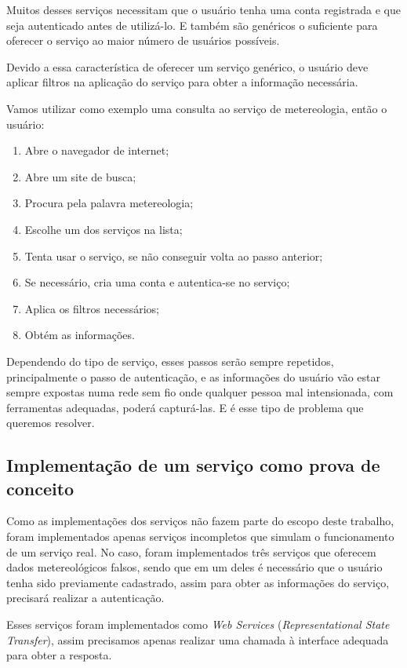 Muitos desses serviços necessitam que o usuário tenha uma conta registrada e que seja autenticado antes de utilizá-lo. E também são genéricos o suficiente para oferecer o serviço ao maior número de usuários possíveis.

Devido a essa característica de oferecer um serviço genérico, o usuário deve aplicar filtros na aplicação do serviço para obter a informação necessária.

Vamos utilizar como exemplo uma consulta ao serviço de metereologia, então o usuário:
\begin{footnotesize}
  \begin{enumerate}
  \item Abre o navegador de internet;
  \item Abre um site de busca;
  \item Procura pela palavra metereologia;
  \item Escolhe um dos serviços na lista;
  \item Tenta usar o serviço, se não conseguir volta ao passo anterior;
  \item Se necessário, cria uma conta e autentica-se no serviço;
  \item Aplica os filtros necessários;
  \item Obtém as informações.
  \end{enumerate}
\end{footnotesize}

Dependendo do tipo de serviço, esses passos serão sempre repetidos, principalmente o passo de autenticação, e as informações do usuário vão estar sempre expostas numa rede sem fio onde qualquer pessoa mal intensionada, com ferramentas adequadas, poderá capturá-las. E é esse tipo de problema que queremos resolver.

\subsection{Implementação de um serviço como prova de conceito}
Como as implementações dos serviços não fazem parte do escopo deste trabalho, foram implementados apenas serviços incompletos que simulam o funcionamento de um serviço real. No caso, foram implementados três serviços que oferecem dados metereológicos falsos, sendo que em um deles é necessário que o usuário tenha sido previamente cadastrado, assim para obter as informações do serviço, precisará realizar a autenticação.

Esses serviços foram implementados como \textit{Web Services}  (\textit{Representational State Transfer}), assim precisamos apenas realizar uma chamada à interface adequada para obter a resposta.

